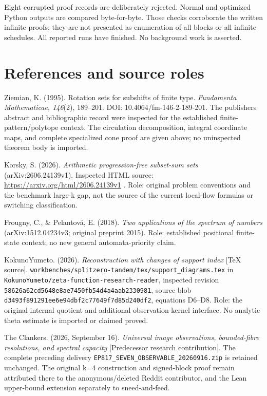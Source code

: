 Eight corrupted proof records are deliberately rejected. Normal and optimized Python outputs are compared byte-for-byte. Those checks corroborate the written infinite proofs; they are not presented as enumeration of all blocks or all infinite schedules. All reported runs have finished. No background work is asserted.

\section{References and source roles}\label{n26-references-and-source-roles}

Ziemian, K. (1995). Rotation sets for subshifts of finite type. \emph{Fundamenta Mathematicae, 146}(2), 189--201. DOI: 10.4064/fm-146-2-189-201. The publisher\textquotesingle s abstract and bibliographic record were inspected for the established finite-pattern/polytope context. The circulation decomposition, integral coordinate maps, and complete specialized cone proof are given above; no uninspected theorem body is imported.

Korsky, S. (2026). \emph{Arithmetic progression-free subset-sum sets} (arXiv:2606.24139v1). Inspected HTML source: \url{https://arxiv.org/html/2606.24139v1} . Role: original problem conventions and the benchmark large-k gap, not the source of the current local-flow formulas or switching classification.

Frougny, C., \& Pelantová, E. (2018). \emph{Two applications of the spectrum of numbers} (arXiv:1512.04234v3; original preprint 2015). Role: established positional finite-state context; no new general automata-priority claim.

KokunoYumeto. (2026). \emph{Reconstruction with changes of support index} {[}TeX source{]}. \nolinkurl{workbenches/splitzero-tandem/tex/support_diagrams.tex} in \nolinkurl{KokunoYumeto/zeta-function-research-reader}, inspected revision \nolinkurl{58626a62cd5648e8ae7450fb54d4a4aab2330981}, source blob \nolinkurl{d3493f891291ee6e94dbf2c77649f7d85d240df2}, equations D6--D8. Role: the original internal quotient and additional observation-kernel interface. No analytic theta estimate is imported or claimed proved.

The Clankers. (2026, September 16). \emph{Universal image observations, bounded-fibre resolutions, and spectral capacity} {[}Predecessor research contribution{]}. The complete preceding delivery \nolinkurl{EP817_SEVEN_OBSERVABLE_20260916.zip} is retained unchanged. The original k=4 construction and signed-block proof remain attributed there to the anonymous/deleted Reddit contributor, and the Lean upper-bound extension separately to sneed-and-feed.
